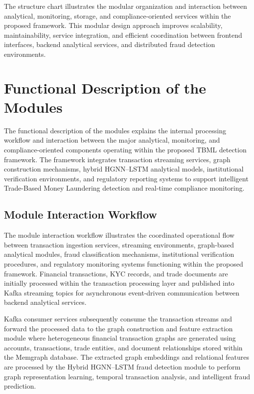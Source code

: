The structure chart illustrates the modular organization and interaction between analytical, monitoring, storage, and compliance-oriented services within the proposed framework. This modular design approach improves scalability, maintainability, service integration, and efficient coordination between frontend interfaces, backend analytical services, and distributed fraud detection environments.

\section[Functional Description of the Modules]{\textbf{Functional Description of the Modules}}

The functional description of the modules explains the internal processing workflow and interaction between the major analytical, monitoring, and compliance-oriented components operating within the proposed TBML detection framework. The framework integrates transaction streaming services, graph construction mechanisms, hybrid HGNN--LSTM analytical models, institutional verification environments, and regulatory reporting systems to support intelligent Trade-Based Money Laundering detection and real-time compliance monitoring.

\subsection[Module Interaction Workflow]{\textbf{Module Interaction Workflow}}

The module interaction workflow illustrates the coordinated operational flow between transaction ingestion services, streaming environments, graph-based analytical modules, fraud classification mechanisms, institutional verification procedures, and regulatory monitoring systems functioning within the proposed framework. Financial transactions, KYC records, and trade documents are initially processed within the transaction processing layer and published into Kafka streaming topics for asynchronous event-driven communication between backend analytical services.

Kafka consumer services subsequently consume the transaction streams and forward the processed data to the graph construction and feature extraction module where heterogeneous financial transaction graphs are generated using accounts, transactions, trade entities, and document relationships stored within the Memgraph database. The extracted graph embeddings and relational features are processed by the Hybrid HGNN--LSTM fraud detection module to perform graph representation learning, temporal transaction analysis, and intelligent fraud prediction.

